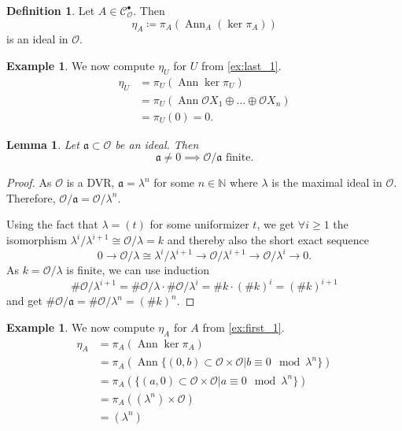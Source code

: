 \documentclass{article}
\theoremstyle{plain}%
\newtheorem{lemma}[theorem]{Lemma}
\theoremstyle{definition}
\newtheorem{definition}[theorem]{Definition}
\newtheorem{example}[theorem]{Example}
\theoremstyle{remark}
\newcommand{\cob}{\mathcal{C}_\mathcal{O}^\bullet}
\newcommand{\ann}{\operatorname{Ann}}
\begin{document}
\begin{definition}
    Let \(A \in \cob\). Then
    \[\eta_A \coloneqq \pi_A(\ann_A (\ker \pi_A))\] is an ideal in \(\mathcal{O}\).
\end{definition}

\begin{example}
    We now compute \(\eta_U\) for \(U\) from \cref{ex:last_1}.
    \begin{align*}
        \eta_U &= \pi_U(\ann \ker \pi_U)\\
        &= \pi_U(\ann \mathcal{O}X_1 \oplus \dots \oplus \mathcal{O}X_n)\\
        &= \pi_U(0) = 0.
    \end{align*}
\end{example}

\begin{lemma}\label{lem:ideals}
    Let \(\mathfrak a \subset \mathcal{O}\) be an ideal. Then
    \[\mathfrak a \neq 0 \implies \mathcal{O}/\mathfrak a \text{ finite}.\]
\end{lemma}
\begin{proof}
    As \(\mathcal{O}\) is a DVR, \(\mathfrak a = \lambda^n\) for some \(n \in \mathbb N\) 
    where \(\lambda\) is the maximal ideal in \(\mathcal{O}\).
    Therefore, \(\mathcal{O}/\mathfrak{a} = \mathcal{O}/\lambda^n.\)

    Using the fact that \(\lambda = (t)\) for some uniformizer \(t\), we get \(\forall i \ge 1\) 
    the isomorphism \(\lambda^i/\lambda^{i+1} \cong \mathcal{O}/\lambda = k\) and thereby also the short exact sequence 
    \[0 \to \mathcal{O}/\lambda \cong \lambda^i/\lambda^{i+1} \to \mathcal{O}/\lambda^{i+1} \to \mathcal{O}/\lambda^{i} \to 0.\]
    As \(k = \mathcal{O}/\lambda\) is finite, we can use induction
    \[\# \mathcal{O}/\lambda^{i+1} = \# \mathcal{O}/\lambda \cdot \# \mathcal{O}/\lambda^i = \# k \cdot (\# k)^i = (\# k)^{i+1}\]
    and get \(\# \mathcal{O}/\mathfrak{a} = \# \mathcal{O}/\lambda^n = (\# k)^n\).
\end{proof}

\begin{example}\label{ex:first_eta}
    We now compute \(\eta_A\) for \(A\) from \cref{ex:first_1}.
    \begin{align*}
        \eta_A &= \pi_A(\ann \ker \pi_A)\\
        &= \pi_A(\ann \{(0, b) \subset \mathcal{O}\times \mathcal{O} | b \equiv 0 \mod \lambda^n\})\\
        &= \pi_A(\{(a, 0) \subset \mathcal{O}\times \mathcal{O} | a \equiv 0 \mod \lambda^n\})\\
        &= \pi_A((\lambda^n) \times \mathcal{O})\\
        &= (\lambda^n)
    \end{align*}
\end{example}
\end{document}
